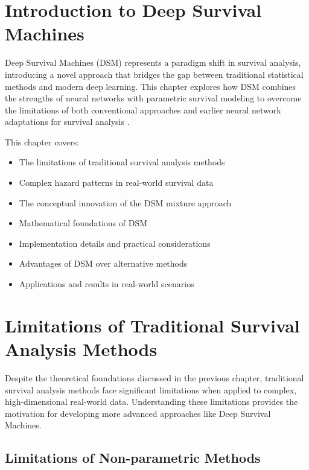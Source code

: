\section{Introduction to Deep Survival Machines}

Deep Survival Machines (DSM) \parencite{nagpal2021dsm} represents a paradigm shift in survival analysis, introducing a novel approach that bridges the gap between traditional statistical methods and modern deep learning. This chapter explores how DSM combines the strengths of neural networks with parametric survival modeling to overcome the limitations of both conventional approaches \parencite{cox1972,kaplan1958} and earlier neural network adaptations for survival analysis \parencite{katzman2018,chapfuwa2018}.

\begin{notebox}[title=Chapter Overview]
This chapter covers:
\begin{itemize}
    \item The limitations of traditional survival analysis methods
    \item Complex hazard patterns in real-world survival data
    \item The conceptual innovation of the DSM mixture approach
    \item Mathematical foundations of DSM
    \item Implementation details and practical considerations
    \item Advantages of DSM over alternative methods
    \item Applications and results in real-world scenarios
\end{itemize}
\end{notebox}

\section{Limitations of Traditional Survival Analysis Methods}

Despite the theoretical foundations discussed in the previous chapter, traditional survival analysis methods face significant limitations when applied to complex, high-dimensional real-world data. Understanding these limitations provides the motivation for developing more advanced approaches like Deep Survival Machines.

\subsection{Limitations of Non-parametric Methods}

